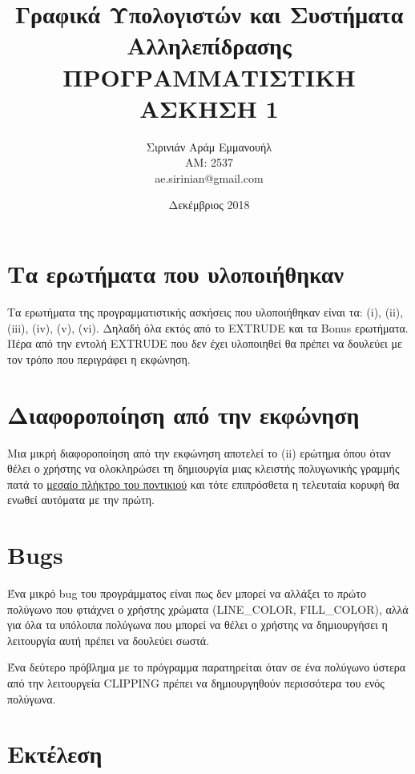 \documentclass{article}
\title{Γραφικά Υπολογιστών και Συστήματα Αλληλεπίδρασης\\ ΠΡΟΓΡΑΜΜΑΤΙΣΤΙΚΗ ΑΣΚΗΣΗ 1}
\author{Σιρινιάν Αράμ Εμμανουήλ \\ AM: 2537\\ \selectlanguage{english}ae.sirinian@gmail.com\selectlanguage{greek}}
\date{Δεκέμβριος 2018}
\begin{document}
\maketitle

\section{Τα ερωτήματα που υλοποιήθηκαν}

Τα ερωτήματα της προγραμματιστικής ασκήσεις που υλοποιήθηκαν είναι τα:
(i), (ii), (iii), (iv), (v), (vi).
Δηλαδή όλα εκτός από το
EXTRUDE
και τα
Bonus
ερωτήματα. Πέρα από την εντολή
EXTRUDE
που δεν έχει υλοποιηθεί θα πρέπει να δουλεύει με τον τρόπο που περιγράφει η εκφώνηση.

\section{Διαφοροποίηση από την εκφώνηση}

Μια μικρή διαφοροποίηση από την εκφώνηση αποτελεί το
(ii)
ερώτημα όπου όταν θέλει ο χρήστης να ολοκληρώσει τη δημιουργία μιας
κλειστής πολυγωνικής γραμμής πατά το \underline{μεσαίο πλήκτρο του ποντικιού}
και τότε επιπρόσθετα η τελευταία κορυφή θα ενωθεί αυτόματα με την πρώτη.

\section{Bugs}

Ένα μικρό
bug
του προγράμματος είναι πως δεν μπορεί να αλλάξει το πρώτο
 πολύγωνο που φτιάχνει ο χρήστης χρώματα
(LINE\_COLOR, FILL\_COLOR),
αλλά για όλα τα υπόλοιπα πολύγωνα που μπορεί να θέλει ο χρήστης να
δημιουργήσει η λειτουργία αυτή πρέπει να δουλεύει σωστά.


Ένα δεύτερο πρόβλημα με το πρόγραμμα παρατηρείται όταν
σε ένα πολύγωνο ύστερα από την λειτουργεία
CLIPPING
πρέπει να δημιουργηθούν περισσότερα του ενός πολύγωνα.

\section{Εκτέλεση}
\end{document}

